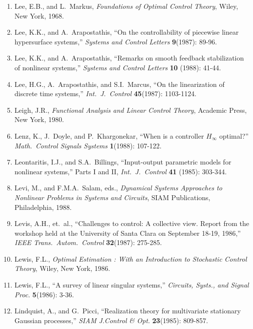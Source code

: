 \begin{enumerate}
\item
Lee, E.B., and L.\ Markus, {\it Foundations of Optimal Control Theory}, Wiley,
New York, 1968.

\item
Lee, K.K., and A.\ Arapostathis, ``On the controllability of piecewise linear
hypersurface systems,'' {\it Systems and Control Letters} {\bf 9}(1987):
89-96.

\item
Lee, K.K., and A.\ Arapostathis, ``Remarks on smooth feedback stabilization of
nonlinear systems,'' {\it Systems and Control Letters} {\bf 10} (1988): 41-44.

\item
Lee, H.G., A.\ Arapostathis, and S.I.\ Marcus, ``On the linearization of
discrete time systems,'' {\it Int.\ J.\ Control} {\bf 45}(1987): 1103-1124.

\item
Leigh, J.R., {\it Functional Analysis and Linear Control Theory}, Academic
Press, New York, 1980.

\item
Lenz, K., J.\ Doyle, and P.\ Khargonekar, ``When is a controller $H_\infty$
optimal?''  {\it Math.\ Control Signals Systems} {\bf 1}(1988): 107-122.

\item
Leontaritis, I.J., and S.A.\ Billings, ``Input-output parametric models for
nonlinear systems,'' Parts I and II, {\it Int.\ J.\ Control} {\bf 41} (1985):
303-344.

\item
Levi, M., and F.M.A.\ Salam, eds., {\it Dynamical Systems Approaches to
Nonlinear Problems in Systems and Circuits}, SIAM Publications, Philadelphia,
1988.

\item
Levis, A.H., et.\ al., ``Challenges to control: A collective view.
Report from the workshop held at the University of Santa Clara on
September 18-19, 1986,'' {\it IEEE Trans.\ Autom.\ Control} {\bf 32}(1987):
275-285.

\item
Lewis, F.L., {\it Optimal Estimation : With an Introduction to Stochastic
Control Theory}, Wiley, New York, 1986.

\item
Lewis, F.L., ``A survey of linear singular systems,'' {\it Circuits, Systs.,
and Signal Proc.} {\bf 5}(1986): 3-36.

\item
Lindquist, A., and G.\ Picci, ``Realization theory for multivariate stationary
Gaussian processes,'' {\it SIAM J.Control \& Opt.} {\bf 23}(1985): 809-857.


\end{enumerate}
